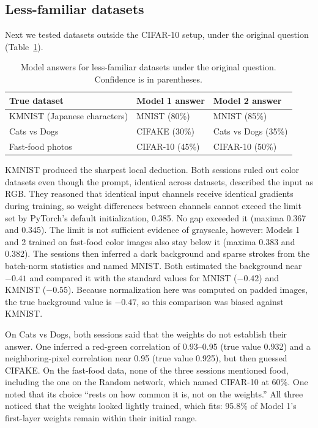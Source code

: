 \documentclass[11pt]{article}
\begin{document}
\subsection{Less-familiar datasets}
\label{sec:lessfamiliar}

Next we tested datasets outside the CIFAR-10 setup, under the original question (Table~\ref{tab:lessfamous}).

\begin{table}[t]
  \centering
  \caption{Model answers for less-familiar datasets under the original question. Confidence is in parentheses.}
  \label{tab:lessfamous}
  \small
  \begin{tabular}{@{}lll@{}}
    \toprule
    True dataset & Model 1 answer & Model 2 answer \\
    \midrule
    KMNIST (Japanese characters) & MNIST (80\%) & MNIST (85\%) \\
    Cats vs Dogs & CIFAKE (30\%) & Cats vs Dogs (35\%) \\
    Fast-food photos & CIFAR-10 (45\%) & CIFAR-10 (50\%) \\
    \bottomrule
  \end{tabular}
\end{table}

KMNIST produced the sharpest local deduction. Both sessions ruled out color datasets even though the prompt, identical across datasets, described the input as RGB. They reasoned that identical input channels receive identical gradients during training, so weight differences between channels cannot exceed the limit set by PyTorch's default initialization, 0.385. No gap exceeded it (maxima 0.367 and 0.345). The limit is not sufficient evidence of grayscale, however: Models 1 and 2 trained on fast-food color images also stay below it (maxima 0.383 and 0.382). The sessions then inferred a dark background and sparse strokes from the batch-norm statistics and named MNIST. Both estimated the background near $-0.41$ and compared it with the standard values for MNIST ($-0.42$) and KMNIST ($-0.55$). Because normalization here was computed on padded images, the true background value is $-0.47$, so this comparison was biased against KMNIST.

On Cats vs Dogs, both sessions said that the weights do not establish their answer. One inferred a red-green correlation of 0.93--0.95 (true value 0.932) and a neighboring-pixel correlation near 0.95 (true value 0.925), but then guessed CIFAKE. On the fast-food data, none of the three sessions mentioned food, including the one on the Random network, which named CIFAR-10 at 60\%. One noted that its choice ``rests on how common it is, not on the weights.'' All three noticed that the weights looked lightly trained, which fits: 95.8\% of Model 1's first-layer weights remain within their initial range.
\end{document}
